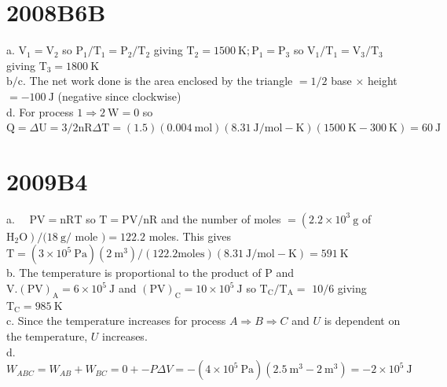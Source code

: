 \begin{enumerate}
\section*{2008B6B}
a. $\mathrm{V}_{1}=\mathrm{V}_{2}$ so $\mathrm{P}_{1} / \mathrm{T}_{1}=\mathrm{P}_{2} / \mathrm{T}_{2}$ giving $\mathrm{T}_{2}=1500 \mathrm{~K} ; \mathrm{P}_{1}=\mathrm{P}_{3}$ so $\mathrm{V}_{1} / \mathrm{T}_{1}=\mathrm{V}_{3} / \mathrm{T}_{3}$ giving $\mathrm{T}_{3}=1800 \mathrm{~K}$\\
$\mathrm{b} / \mathrm{c}$. The net work done is the area enclosed by the triangle $=1 / 2$ base $\times$ height $=-100 \mathrm{~J}$ (negative since clockwise)\\
d. For process $1 \Rightarrow 2 \mathrm{~W}=0$ so $\mathrm{Q}=\Delta \mathrm{U}=3 / 2 \mathrm{nR} \Delta \mathrm{T}=(1.5)(0.004 \mathrm{~mol})(8.31 \mathrm{~J} / \mathrm{mol}-\mathrm{K})(1500 \mathrm{~K}-300 \mathrm{~K})=60 \mathrm{~J}$

\section*{2009B4}
a. $\quad \mathrm{PV}=\mathrm{nRT}$ so $\mathrm{T}=\mathrm{PV} / \mathrm{nR}$ and the number of moles $=\left(2.2 \times 10^{3} \mathrm{~g}\right.$ of $\left.\mathrm{H}_{2} \mathrm{O}\right) /(18 \mathrm{~g} /$ mole $)=122.2$ moles. This gives $\mathrm{T}=\left(3 \times 10^{5} \mathrm{~Pa}\right)\left(2 \mathrm{~m}^{3}\right) /(122.2 \mathrm{moles})(8.31 \mathrm{~J} / \mathrm{mol}-\mathrm{K})=591 \mathrm{~K}$\\
b. The temperature is proportional to the product of P and $\mathrm{V} .(\mathrm{PV})_{\mathrm{A}}=6 \times 10^{5} \mathrm{~J}$ and $(\mathrm{PV})_{\mathrm{C}}=10 \times 10^{5} \mathrm{~J}$ so $\mathrm{T}_{\mathrm{C}} / \mathrm{T}_{\mathrm{A}}=$ $10 / 6$ giving $\mathrm{T}_{\mathrm{C}}=985 \mathrm{~K}$\\
c. Since the temperature increases for process $A \Rightarrow B \Rightarrow C$ and $U$ is dependent on the temperature, $U$ increases.\\
d. $W_{A B C}=W_{A B}+W_{B C}=0+-P \Delta V=-\left(4 \times 10^{5} \mathrm{~Pa}\right)\left(2.5 \mathrm{~m}^{3}-2 \mathrm{~m}^{3}\right)=-2 \times 10^{5} \mathrm{~J}$


\end{enumerate}
